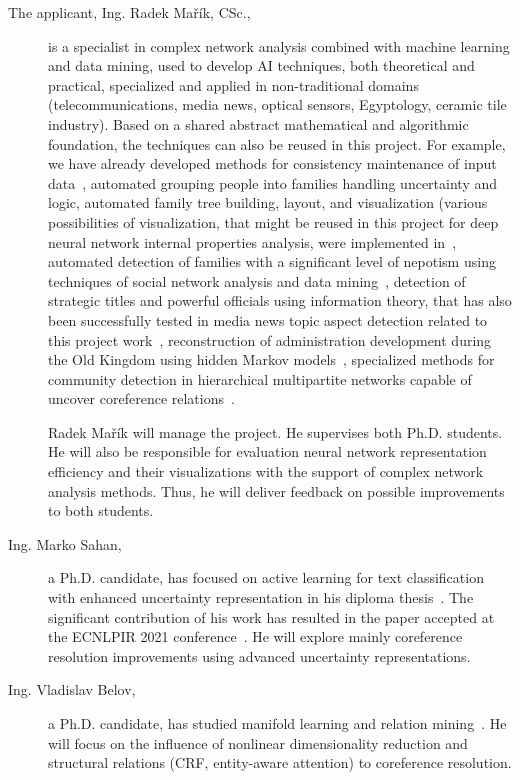 \begin{description}
	\item [The applicant, Ing. Radek Mařík, CSc.,]  is a specialist in complex network analysis combined with machine learning and data mining, used to develop AI techniques, both theoretical and practical, specialized and applied in non-traditional domains (telecommunications, media news, optical sensors, Egyptology, ceramic tile industry). Based on a shared abstract mathematical and algorithmic foundation, the techniques can also be reused in this project. For example, we have already developed methods for consistency maintenance of input data~\cite{Marik2016c}, automated grouping people into families handling uncertainty and logic, automated family tree building, layout, and visualization (various possibilities of visualization, that might be reused in this project for deep neural network internal properties analysis, were implemented in~\cite{Marik2016,Marik2016b,Marik2017d,Marik2017,Marik2018a,Marik2019a}, automated detection of families with a significant level of nepotism using techniques of social network analysis and data mining~\cite{Dulikova2015,Dulikova2017b}, detection of strategic titles and powerful officials using information theory, that has also been successfully tested in media news topic aspect detection related to this project work~\cite{Marik2018c}, reconstruction of administration development during the Old Kingdom using hidden Markov models~\cite{Dulikova2017b,Marik2017e}, specialized methods for community detection in hierarchical multipartite networks capable of uncover coreference relations~\cite{Marik2018d,Belov2020,Zikmund2020}. 
	
Radek Mařík will manage the project. He supervises both Ph.D. students. He will also be responsible for evaluation neural network representation efficiency and their visualizations with the support of complex network analysis methods. Thus, he will deliver feedback on possible improvements to both students.

\item [Ing. Marko Sahan,] a Ph.D. candidate, has focused on active learning for text classification with enhanced uncertainty representation in his diploma thesis~\cite{Sahan2020}. The significant contribution of his work has resulted in the paper accepted at the ECNLPIR 2021 conference~\cite{Sahan2021}. He will explore mainly coreference resolution improvements using advanced uncertainty representations.

\item [Ing. Vladislav Belov,] a Ph.D. candidate, has studied manifold learning and relation mining~\cite{Belov2020}. He will focus on the influence of nonlinear dimensionality reduction and structural relations (CRF, entity-aware attention) to coreference resolution.

\end{description}


